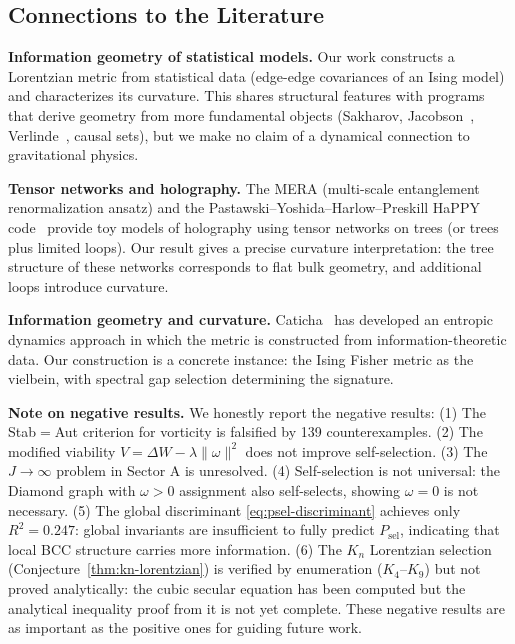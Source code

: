 \documentclass[11pt]{article}
\theoremstyle{definition}
\theoremstyle{remark}
\newcommand{\vort}{\omega}
\begin{document}
\subsection{Connections to the Literature}

\textbf{Information geometry of statistical models.}
Our work constructs a Lorentzian metric from statistical data
(edge-edge covariances of an Ising model) and characterizes its
curvature.  This shares structural features with programs that
derive geometry from more fundamental objects
(Sakharov, Jacobson~\cite{Jacobson1995},
Verlinde~\cite{Verlinde2011}, causal sets), but we make no claim
of a dynamical connection to gravitational physics.

\textbf{Tensor networks and holography.} The MERA (multi-scale entanglement
renormalization ansatz) and the Pastawski--Yoshida--Harlow--Preskill
HaPPY code~\cite{Pastawski2015} provide toy models of holography using
tensor networks on trees (or trees plus limited loops). Our result gives
a precise curvature interpretation: the tree structure of these networks
corresponds to flat bulk geometry, and additional loops introduce curvature.

\textbf{Information geometry and curvature.} Caticha~\cite{Caticha2019}
has developed an entropic dynamics approach in which the metric
is constructed from information-theoretic data. Our construction is
a concrete instance: the Ising Fisher metric as the vielbein, with
spectral gap selection determining the signature.

\textbf{Note on negative results.} We honestly report the negative results:
(1) The Stab$=$Aut criterion for vorticity is falsified by 139 counterexamples.
(2) The modified viability $V = \Delta W - \lambda\|\vort\|^2$ does not
improve self-selection. (3) The $J \to \infty$ problem in Sector A is
unresolved. (4) Self-selection is not universal: the Diamond graph with
$\vort > 0$ assignment also self-selects, showing $\vort = 0$ is not necessary.
(5) The global discriminant \eqref{eq:psel-discriminant} achieves only
$R^2 = 0.247$: global invariants are insufficient to fully predict $P_{\mathrm{sel}}$,
indicating that local BCC structure carries more information.
(6) The $K_n$ Lorentzian selection (Conjecture~\ref{thm:kn-lorentzian})
is verified by enumeration ($K_4$--$K_9$) but not proved analytically:
the cubic secular equation has been computed but the analytical inequality
proof from it is not yet complete.
These negative results are as important as the positive ones for guiding
future work.
\end{document}
